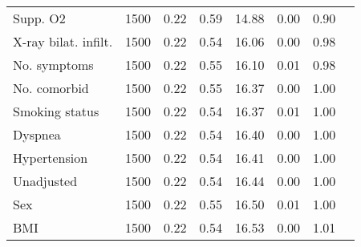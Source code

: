 \documentclass{article}
\begin{document}
{\begin{longtable}{lccccccc}
Supp. O2 & 1500 & 0.22 & 0.59 &  14.88 &  0.00 & 0.90 \\ 
X-ray bilat. infilt. & 1500 & 0.22 & 0.54 &  16.06 &  0.00 & 0.98 \\ 
No. symptoms & 1500 & 0.22 & 0.55 &  16.10 &  0.01 & 0.98 \\ 
No. comorbid & 1500 & 0.22 & 0.55 &  16.37 &  0.00 & 1.00 \\ 
Smoking status & 1500 & 0.22 & 0.54 &  16.37 &  0.01 & 1.00 \\ 
Dyspnea & 1500 & 0.22 & 0.54 &  16.40 &  0.00 & 1.00 \\ 
Hypertension & 1500 & 0.22 & 0.54 &  16.41 &  0.00 & 1.00 \\ 
Unadjusted & 1500 & 0.22 & 0.54 &  16.44 &  0.00 & 1.00 \\ 
Sex & 1500 & 0.22 & 0.55 &  16.50 &  0.01 & 1.00 \\ 
BMI & 1500 & 0.22 & 0.54 &  16.53 &  0.00 & 1.01 \\
\bottomrule
\hline
\end{longtable}
}

\clearpage
\end{document}
